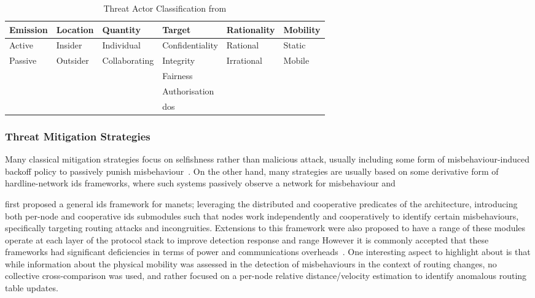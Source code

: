 \begin{table}
  \caption[Threat Actor Classification]{Threat Actor Classification from \citet{Gagandeep2012}}
  \label{tab:attacker_class}
  \begin{tabularx}{\textwidth}{X X X X X X}\toprule
    Emission & Location & Quantity & Target & Rationality & Mobility \\\midrule
    Active & Insider & Individual & Confidentiality & Rational & Static\\
    Passive & Outsider & Collaborating & Integrity & Irrational & Mobile\\
            &         &               & Fairness & & \\
            &         &               & Authorisation & &\\
            &         &               &  \gls{dos} & &\\
    \bottomrule
    
  \end{tabularx}
\end{table}


\subsubsection{Threat Mitigation Strategies}



Many classical mitigation strategies focus on selfishness rather than malicious attack, usually including some form of misbehaviour-induced backoff policy to passively punish misbehaviour~\cite{Konorski2002,Cardenas:2004:DPM:1029102.1029107}.
On the other hand, many  strategies are usually based on some derivative form of hardline-network \gls{ids} frameworks, where such systems passively observe a network for misbehaviour and 

\citet{zhang2003intrusion} first proposed a general \gls{ids} framework for \glspl{manet}; leveraging the distributed and cooperative predicates of the architecture, introducing both per-node and cooperative \gls{ids} submodules such that nodes work independently and cooperatively to identify certain misbehaviours, specifically targeting routing attacks and incongruities.
Extensions to this framework were also proposed to have a range of these modules operate at each layer of the protocol stack to improve detection response and range\cite{Parker2006}
However it is commonly accepted that these frameworks had significant deficiencies in terms of power and communications overheads~\cite{csen2010security,Ryu2008}.
One interesting aspect to highlight about \citet{zhang2003intrusion} is that while information about the physical mobility was assessed in the detection of misbehaviours in the context of routing changes, no collective cross-comparison was used, and rather focused on a per-node relative distance/velocity estimation to identify anomalous routing table updates.

